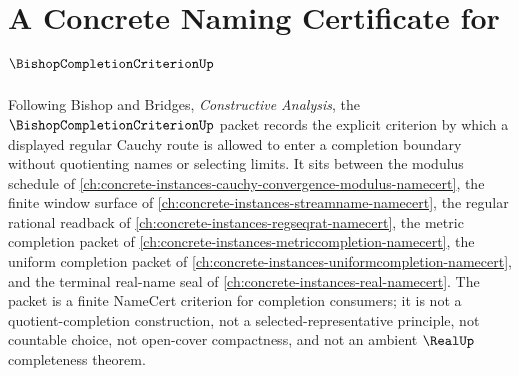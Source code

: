 \chapter{A Concrete Naming Certificate for $\BishopCompletionCriterionUp$}
\label{ch:concrete-instances-bishop-completion-criterion-namecert}

Following Bishop and Bridges, \emph{Constructive Analysis}, the $\BishopCompletionCriterionUp$ packet records the explicit criterion by which a displayed regular Cauchy route is allowed to enter a completion boundary without quotienting names or selecting limits. It sits between the modulus schedule of \autoref{ch:concrete-instances-cauchy-convergence-modulus-namecert}, the finite window surface of \autoref{ch:concrete-instances-streamname-namecert}, the regular rational readback of \autoref{ch:concrete-instances-regseqrat-namecert}, the metric completion packet of \autoref{ch:concrete-instances-metriccompletion-namecert}, the uniform completion packet of \autoref{ch:concrete-instances-uniformcompletion-namecert}, and the terminal real-name seal of \autoref{ch:concrete-instances-real-namecert}. The packet is a finite NameCert criterion for completion consumers; it is not a quotient-completion construction, not a selected-representative principle, not countable choice, not open-cover compactness, and not an ambient $\RealUp$ completeness theorem.

